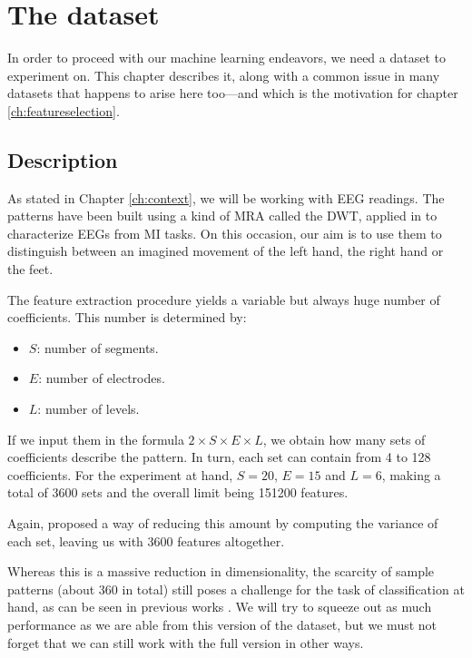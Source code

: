 \chapter{The dataset}\label{ch:dataset}

In order to proceed with our machine learning endeavors, we need a dataset to experiment on. This chapter describes it, along with a common issue in many datasets that happens to arise here too---and which is the motivation for chapter \ref{ch:featureselection}.

\section{Description}

	As stated in Chapter \ref{ch:context}, we will be working with \acs{EEG} readings. The patterns have been built using a kind of \ac{MRA} \cite{daubechies1992ten} called the \ac{DWT}, applied in \cite{asensio2013multiresolution} to characterize \acs{EEG}s from \ac{MI} tasks. On this occasion, our aim is to use them to distinguish between an imagined movement of the left hand, the right hand or the feet.

	The feature extraction procedure yields a variable but always huge number of coefficients. This number is determined by:

	\begin{itemize}

		\item
		$S$: number of segments.

		\item
		$E$: number of electrodes.

		\item
		$L$: number of levels.

	\end{itemize}

	If we input them in the formula $2 \times S \times E \times L$, we obtain how many sets of coefficients describe the pattern. In turn, each set can contain from 4 to 128 coefficients. For the experiment at hand, $S = 20$, $E = 15$ and $L = 6$, making a total of 3600 sets and the overall limit being 151200 features.

	Again, \cite{asensio2013multiresolution} proposed a way of reducing this amount by computing the variance of each set, leaving us with 3600 features altogether.

	Whereas this is a massive reduction in dimensionality, the scarcity of sample patterns (about 360 in total) still poses a challenge for the task of classification at hand, as can be seen in previous works \cite{ortega2017deep}. We will try to squeeze out as much performance as we are able from this version of the dataset, but we must not forget that we can still work with the full version in other ways.

